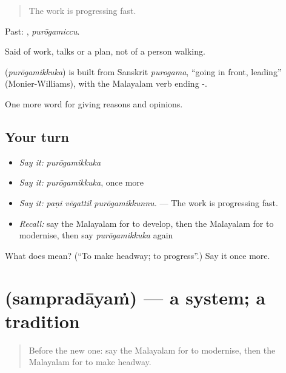 \begin{quote}
The work is progressing fast.
\end{quote}

Past: , \emph{purōgamiccu}.

Said of work, talks or a plan, not of a person walking.

\begin{cousinweb}
\textbf{} (\emph{purōgamikkuka}) is built from Sanskrit \emph{purogama}, \textquotedblleft{}going in front, leading\textquotedblright{} (Monier-Williams), with the Malayalam verb ending -.
\end{cousinweb}

\begin{grammarlens}[title={What you've built}]
One more word for giving reasons and opinions.
\end{grammarlens}

\subsection*{Your turn}
\begin{itemize}
\raggedright
  \item \emph{Say it:} \emph{purōgamikkuka}
  \item \emph{Say it:} \emph{purōgamikkuka}, once more
  \item \emph{Say it:} \emph{paṇi vēgattil purōgamikkunnu.} — The work is progressing fast.
  \item \emph{Recall:} say the Malayalam for to develop, then the Malayalam for to modernise, then say \emph{purōgamikkuka} again
\end{itemize}

\begin{tcolorbox}[breakable,colback=teal!4,colframe=teal!35!black,title={Before you move on}]
What does  mean? (\textquotedblleft{}To make headway; to progress\textquotedblright{}.) Say it once more.
\end{tcolorbox}
\section[\texorpdfstring{\ml{സമ്പ്രദായം} (sampradāyaṁ)}{സമ്പ്രദായം (sampradāyaṁ)}]{ (sampradāyaṁ) — a system; a tradition}

\label{lesson:ML-C431-sampradayam}



\begin{quote}
Before the new one: say the Malayalam for to modernise, then the Malayalam for to make headway.
\end{quote}

